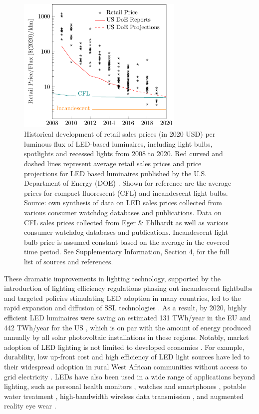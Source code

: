 \documentclass[parskip=full]{article}
\begin{document}
\begin{figure}[h!]
\centering
  \includegraphics[height=6.5cm]{figures/cost_lamp_small.pdf}
  \caption{Historical development of retail sales prices (in 2020 USD) per luminous flux of LED-based luminaires, including light bulbs, spotlights and recessed lights from 2008 to 2020. Red curved and dashed lines represent average retail sales prices and price projections for LED based luminaires published by the U.S. Department of Energy (DOE) \cite{council2013assessment}. Shown for reference are the average prices for compact fluorescent (CFL) and incandescent light bulbs. Source: own synthesis of data on LED sales prices collected from various consumer watchdog databases and publications. Data on CFL sales prices collected from Eger \& Ehlhardt \cite{eger2018origin} as well as various consumer watchdog databases and publications. Incandescent light bulb price is assumed constant based on the average in the covered time period. See Supplementary Information, Section 4, for the full list of sources and references.}
  \label{fgr:cost_lamp_small}
\end{figure}

These dramatic improvements in lighting technology, supported by the introduction of lighting efficiency regulations phasing out incandescent lightbulbs and targeted policies stimulating LED adoption in many countries, led to the rapid expansion and diffusion of SSL technologies \cite{weinold2020long,Stegmaier2021}. As a result, by 2020, highly efficient LED luminaires were saving an estimated 131 TWh/year in the EU \cite{eu2019impactass} and 442 TWh/year for the US \cite{guidehouse2020adoption}, which is on par with the amount of energy produced annually by all solar photovoltaic installations in these regions. Notably, market adoption of LED lighting is not limited to developed economies \cite{Kamat2020}. For example, durability, low up-front cost and high efficiency of LED light sources have led to their widespread adoption in rural West African communities without access to grid electricity \cite{Bensch2017}. LEDs have also been used in a wide range of applications beyond lighting, such as personal health monitors \cite{Wyatt2020}, watches and smartphones \cite{Bai2017}, potable water treatment \cite{Lui2014}, high-bandwidth wireless data transmission \cite{Haas2016}, and augmented reality eye wear \cite{Lee2016}. 
\end{document}
